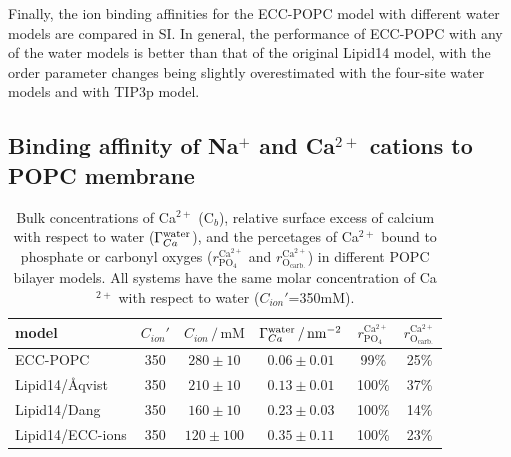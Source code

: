 \documentclass[aip,jcp,twocolumn]{revtex4}
\begin{document}
Finally, the ion binding affinities for the ECC-POPC model with different water models are compared in SI. In general, the performance of ECC-POPC with any of the water models is better than that of the original Lipid14 model, with the order parameter changes being slightly overestimated with the four-site water models and with TIP3p model.


\subsection{Binding affinity of Na$^+$ and Ca$^{2+}$ cations to POPC membrane}
\label{sec:affinity}

\begin{table}[tb!]
  \caption{Bulk concentrations of Ca$^{2+}$ (C$_b$), relative surface excess of calcium with respect to water ($\Gamma_{Ca}^{\rm water}$),
    and the percetages of Ca$^{2+}$ bound to phosphate or carbonyl oxyges ($r^\mathrm{Ca^{2+}} _\mathrm{PO_4} $ and $r^\mathrm{Ca^{2+}} _\mathrm{O_{carb.}}$)
    in different POPC bilayer models. All systems have the same molar concentration of Ca$^{2+}$ with respect to water ($C_{ion}'$=350mM).
  \label{tab:binding}}
  \begin{tabular}{l|c c | c | c c}
    model                  & $C_{ion}'$ & $C_{ion}\,/\,\mathrm{mM}$ & $\Gamma_{Ca}^{\rm water} \,/\, \mathrm{nm}^{-2}$  & $r^\mathrm{Ca^{2+}} _\mathrm{PO_4} $ & $r^\mathrm{Ca^{2+}} _\mathrm{O_{carb.}} $ \\
    \hline
    ECC-POPC             &  350  &  $280\pm 10 $  &  $0.06 \pm 0.01 $                           &  99\%  &    25\%    \\
    Lipid14/\AA{}qvist     &  350  &  $210\pm 10 $  &  $0.13 \pm 0.01 $                          & 100\%  &    37\%     \\
    Lipid14/Dang           &  350  &  $160\pm 10 $  &  $0.23 \pm 0.03 $                            & 100\%  &    14\%    \\
    Lipid14/ECC-ions       &  350  &  $120\pm 100$  &  $0.35 \pm 0.11 $                         & 100\%  &    23\%    \\
  \end{tabular}
\end{table}
\end{document}
